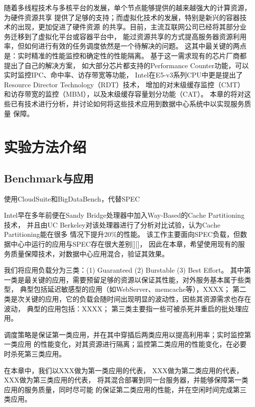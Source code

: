 随着多线程技术与多核平台的发展，单个节点能够提供的越来越强大的计算资源，为硬件资源共享
提供了足够的支持；而虚拟化技术的发展，特别是新兴的容器技术的出现，更加促进了硬件资源
的共享。目前，主流互联网公司已经将其部分业务迁移到了虚拟化平台或容器平台中，
能过资源共享的方式提高服务器资源利用率，但如何进行有效的任务调度依然是一个待解决的问题。
这其中最关键的两点是：实时精准的性能监控和确定性的性能隔离。
基于这一需求现有的芯片厂商都提出了自己的解决方案， %
如大部分芯片都支持的Performance Counter功能，可以实时监控IPC、命中率、访存带宽等功能，
Intel在E5-v3系列CPU中更是提出了Resource Director Technology（RDT）技术，
增加的对末级缓存监控（CMT）和访存带宽的监控（MBM），以及末级缓存容量划分功能（CAT）。
本章的将对这些已有技术进行分析，并讨论如何将这些技术应用到数据中心系统中以实现服务质量
保障。

\section{实验方法介绍}

\subsection{Benchmark与应用}

使用CloudSuite和BigDataBench，代替SPEC

Intel早在多年前便在Sandy Bridge处理器中加入Way-Based的Cache Partitioning技术，
并且由UC Berkeley对该处理器进行了分析对比试验，认为Cache Partitioning能在很多
情况下提升20\%的性能。
该工作主要面向SPEC负载，但数据中心中运行的应用与SPEC存在很大差别[][]，
因此在本章，希望使用现有的服务质量保障技术，对数据中心应用混合，验证其效果。

我们将应用负载分为三类：(1) Guaranteed (2) Burstable (3) Best Effort。
其中第一类是最关键的应用，需要预留足够的资源以保证其性能，对外服务基本属于些类型，
典型包括延迟敏感型的应用（如WebServer、memcache等），XXXX； %
第二类是次关键的应用，它的负载会随时间出现明显的波动性，因些其资源需求也存在波动，
典型的应用包括：XXXX； %
第三类主要指一些可被杀死并重启的批处理应用。 %

调度策略是保证第一类应用，并在其中穿插后两类应用以提高利用率；实时监控第一类应用
的性能变化，对其资源进行隔离；监控第二类应用的性能变化，在必要时杀死第三类应用。

在本章中，我们以XXX做为第一类应用的代表， %
XXX做为第二类应用的代表，			%
XXX做为第三类应用的代表，			%
将其混合部署到同一台服务器，并能够保障第一类应用的服务质量，同时尽可能
的保证第二类应用的性能，并在空闲时间完成第三类应用。

